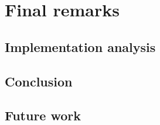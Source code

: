 \chapter{Final remarks}
\label{chapter-future}

\section{Implementation analysis}


\section{Conclusion}

\section{Future work}


